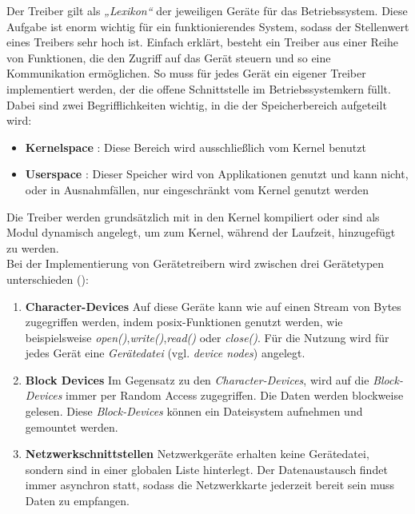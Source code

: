 Der Treiber gilt als \emph{„Lexikon“} der jeweiligen Geräte für das Betriebssystem.
Diese Aufgabe ist enorm wichtig für ein funktionierendes System, sodass der Stellenwert
eines Treibers sehr hoch ist. Einfach erklärt, besteht ein Treiber aus einer Reihe von
Funktionen, die den Zugriff auf das Gerät steuern und so eine Kommunikation ermöglichen.
So muss für jedes Gerät ein eigener Treiber implementiert werden, der die offene
Schnittstelle im Betriebssystemkern füllt. \\
Dabei sind zwei Begrifflichkeiten wichtig, in die der Speicherbereich aufgeteilt wird:
\begin{itemize}
\item \textbf{Kernelspace} : Diese Bereich wird ausschließlich vom Kernel benutzt
\item \textbf{Userspace} : Dieser Speicher wird von Applikationen genutzt und kann nicht,
                          oder in Ausnahmfällen, nur eingeschränkt vom Kernel genutzt werden
\end{itemize}

Die Treiber werden grundsätzlich mit in den Kernel kompiliert oder sind als Modul dynamisch
angelegt, um zum Kernel, während der Laufzeit, hinzugefügt zu werden. \cite{treiberbib}\\

Bei der Implementierung von Gerätetreibern wird zwischen drei Gerätetypen unterschieden (\cite{treiberbib}):\\
\begin{enumerate}
\item \textbf{Character-Devices} Auf diese Geräte kann wie auf einen Stream von Bytes zugegriffen werden, indem
      \ac{posix}-Funktionen genutzt werden, wie beispielsweise \emph{open()},\emph{write()},\emph{read()} oder \emph{close()}.
      Für die Nutzung wird für jedes Gerät eine \emph{Gerätedatei} (vgl. \emph{device nodes}) angelegt.
\item \textbf{Block Devices} Im Gegensatz zu den \emph{Character-Devices}, wird auf die \emph{Block-Devices} immer per Random Access zugegriffen.
      Die Daten werden blockweise gelesen. Diese \emph{Block-Devices} können ein Dateisystem aufnehmen und gemountet werden.
\item \textbf{Netzwerkschnittstellen} Netzwerkgeräte erhalten keine Gerätedatei, sondern sind in einer globalen Liste hinterlegt.
      Der Datenaustausch findet immer asynchron statt, sodass die Netzwerkkarte jederzeit bereit sein muss Daten zu empfangen.
\end{enumerate}


